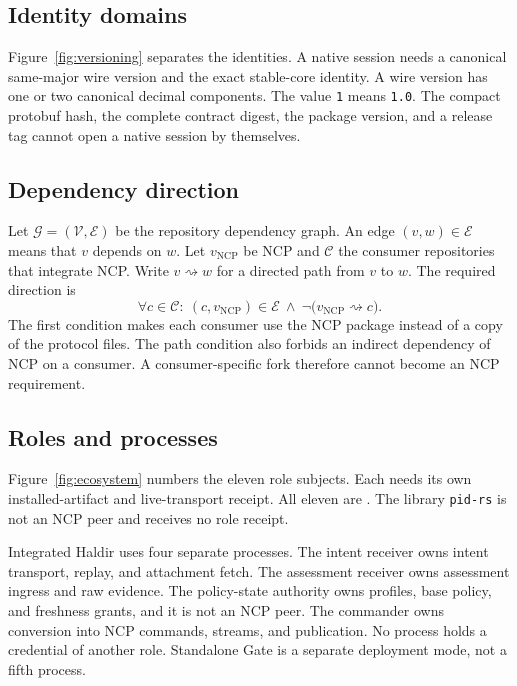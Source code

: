 \documentclass[11pt,a4paper]{article}
\theoremstyle{definition}
\let\NcpTextttBase\texttt
\renewcommand{\texttt}[1]{\mbox{\NcpTextttBase{#1}}}
\begin{document}
\subsection{Identity domains}

Figure~\ref{fig:versioning} separates the identities. A native session needs a
canonical same-major wire version and the exact stable-core identity. A wire version
has one or two canonical decimal components. The value \texttt{1} means \texttt{1.0}.
The compact protobuf hash, the complete contract digest, the package version, and a
release tag cannot open a native session by themselves.


\subsection{Dependency direction}

Let $\mathcal{G}=(\mathcal{V},\mathcal{E})$ be the repository dependency graph. An edge
$(v,w)\in\mathcal{E}$ means that $v$ depends on $w$. Let $v_{\mathrm{NCP}}$ be NCP and
$\mathcal{C}$ the consumer repositories that integrate NCP. Write
$v\rightsquigarrow w$ for a directed path from $v$ to $w$. The required direction is
\begin{equation}\label{eq:dependency}
\forall c\in\mathcal{C}:\ (c,v_{\mathrm{NCP}})\in\mathcal{E}\ \land\
\neg\bigl(v_{\mathrm{NCP}}\rightsquigarrow c\bigr).
\end{equation}
The first condition makes each consumer use the NCP package instead of a copy of the
protocol files. The path condition also forbids an indirect dependency of NCP on a
consumer. A consumer-specific fork therefore cannot become an NCP requirement.


\subsection{Roles and processes}

Figure~\ref{fig:ecosystem} numbers the eleven role subjects. Each needs its own
installed-artifact and live-transport receipt. All eleven are \NcpNotRun. The
library \texttt{pid-rs} is not an NCP peer and receives no role receipt.

Integrated Haldir uses four separate processes. The intent receiver owns intent
transport, replay, and attachment fetch. The assessment receiver owns assessment
ingress and raw evidence. The policy-state authority owns profiles, base policy, and
freshness grants, and it is not an NCP peer. The commander owns conversion into NCP
commands, streams, and publication. No process holds a credential of another role.
Standalone Gate is a separate deployment mode, not a fifth process.
\end{document}
